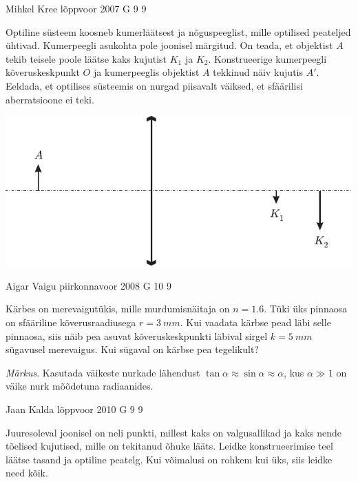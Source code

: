 \documentclass[11pt, twoside]{article}
\begin{document}
{%
{Mihkel Kree} %
{lõppvoor} %
{2007} %
{G 9} %
{9} %
{
\ifStatement
Optiline süsteem koosneb kumerläätsest ja nõguspeeglist, mille optilised peateljed ühtivad. Kumerpeegli asukohta pole joonisel märgitud. On teada, et objektist $A$ tekib teisele poole läätse kaks kujutist $K_1$ ja $K_2$. Konstrueerige kumerpeegli kõveruskeskpunkt $O$ ja kumerpeeglis objektist $A$ tekkinud näiv kujutis $A'$. Eeldada, et optilises süsteemis on nurgad piisavalt väiksed, et sfäärilisi aberratsioone ei teki.

\begin{center}
	\includegraphics[width=\linewidth]{2007-v3g-09-yl}
\end{center}
\fi
}

{Aigar Vaigu} %
{piirkonnavoor} %
{2008} %
{G 10} %
{9} %
{
\ifStatement
Kärbes on merevaigutükis, mille murdumisnäitaja on $n=\num{1,6}$. Tüki üks pinnaosa on sfääriline kõverusraadiusega $r = \SI{3}{mm}$. Kui vaadata kärbse pead läbi selle pinnaosa, siis näib pea asuvat kõveruskeskpunkti läbival sirgel $k = \SI{5}{mm}$ sügavusel merevaigus. Kui sügaval on kärbse pea tegelikult? 

\emph{Märkus}. Kasutada väikeste nurkade lähendust $\tan \alpha \approx \sin \alpha \approx \alpha$, kus $\alpha \gg 1$ on väike nurk mõõdetuna radiaanides.
\fi
}

{Jaan Kalda} %
{lõppvoor} %
{2010} %
{G 9} %
{9} %
{
\ifStatement
Juuresoleval joonisel on neli punkti, millest kaks on valgusallikad ja kaks nende tõelised kujutised, mille on tekitanud õhuke lääts. Leidke konstrueerimise teel läätse tasand ja optiline peatelg. Kui võimalusi on rohkem kui üks, siis leidke need kõik.

}}
\end{document}
